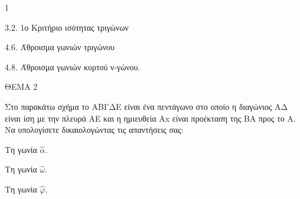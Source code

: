 \begin{ylh}{1}
    \item 3.2. 1ο Κριτήριο ισότητας τριγώνων
    \item 4.6. Άθροισμα γωνιών τριγώνου
    \item 4.8. Άθροισμα γωνιών κυρτού ν-γώνου.
\end{ylh}

ΘΕΜΑ 2

Στο παρακάτω σχήμα το ΑΒΓΔΕ είναι ένα πεντάγωνο στο οποίο η διαγώνιος ΑΔ είναι ίση με την πλευρά ΑΕ και η ημιευθεία Αx είναι προέκταση της ΒΑ προς το Α. Να υπολογίσετε δικαιολογώντας τις απαντήσεις σας:

\begin{alist}
\item Τη γωνία $\widehat{\alpha}$. 

\item Τη γωνία $\widehat{\omega}$. 

\item Τη γωνία $\widehat{\varphi}$. 


\begin{center}
\end{center}
\end{alist}
